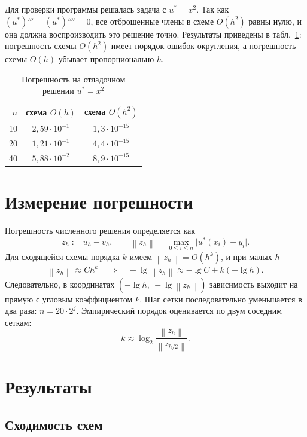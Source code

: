 \documentclass[12pt,a4paper]{article}
\newcommand{\norm}[1]{\left\lVert #1\right\rVert}
\begin{document}
Для проверки программы решалась задача с $u^{\ast} = x^2$. Так как
$(u^{\ast})''' = (u^{\ast})'''' = 0$, все отброшенные члены в схеме
$O(h^2)$ равны нулю, и она должна воспроизводить это решение точно.
Результаты приведены в табл.~\ref{tab:debug}: погрешность схемы $O(h^2)$
имеет порядок ошибок округления, а погрешность схемы $O(h)$ убывает
пропорционально $h$.

\begin{table}[htbp]
\caption{Погрешность на отладочном решении $u^{\ast} = x^2$}
\label{tab:debug}
\centering
\begin{tabular}{rcc}
\toprule
$n$ & схема $O(h)$ & схема $O(h^2)$\\
\midrule
10 & $2{,}59\cdot10^{-1}$ & $1{,}3\cdot10^{-15}$\\
20 & $1{,}21\cdot10^{-1}$ & $4{,}4\cdot10^{-15}$\\
40 & $5{,}88\cdot10^{-2}$ & $8{,}9\cdot10^{-15}$\\
\bottomrule
\end{tabular}
\end{table}

\section{Измерение погрешности}

Погрешность численного решения определяется как
\[
z_h := u_h - v_h,\qquad \norm{z_h} = \max_{0\le i\le n}\lvert u^{\ast}(x_i) - y_i\rvert .
\]
Для сходящейся схемы порядка $k$ имеем $\norm{z_h} = O(h^k)$, и при
малых $h$
\[
\norm{z_h}\approx Ch^k\quad\Longrightarrow\quad
-\lg\norm{z_h}\approx -\lg C + k(-\lg h).
\]
Следовательно, в координатах $(-\lg h,\ -\lg\norm{z_h})$ зависимость
выходит на прямую с угловым коэффициентом $k$. Шаг сетки
последовательно уменьшается в два раза: $n = 20\cdot 2^j$. Эмпирический
порядок оценивается по двум соседним сеткам:
\[
k\approx\log_2\frac{\norm{z_h}}{\norm{z_{h/2}}}.
\]

\section{Результаты}

\subsection{Сходимость схем}
\end{document}
